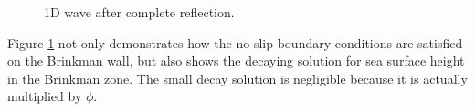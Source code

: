 \begin{center}
 \begin{figure}[h!]
\centering
{}
\caption[ 1D wave after complete reflection]{1D wave after complete reflection.}
\label{f:reflected_wave}
\end{figure}
\end{center}

Figure \ref{f:reflected_wave} not only demonstrates how the no slip boundary conditions are satisfied on the Brinkman wall, but also shows the decaying solution for sea surface height in the Brinkman zone.  The small decay solution is negligible because it is actually multiplied by $\phi$.  

